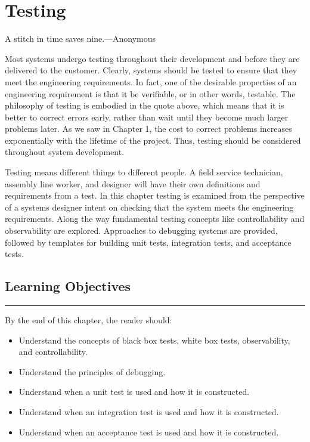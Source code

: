 \chapter{Testing}
\label{chapter:testing}
\graphicspath{ {./chapter07/Fig} }

\begin{itquote}
A stitch in time saves nine.---Anonymous
\end{itquote}


Most systems undergo testing throughout their development and before
they are delivered to the customer. Clearly, systems should be tested to
ensure that they meet the engineering requirements. In fact, one of the
desirable properties of an engineering requirement is that it be
verifiable, or in other words, testable. The philosophy of testing is
embodied in the quote above, which means that it is better to correct
errors early, rather than wait until they become much larger problems
later. As we saw in Chapter 1, the cost to correct problems increases
exponentially with the lifetime of the project. Thus, testing should be
considered throughout system development.

Testing means different things to different people. A field service
technician, assembly line worker, and designer will have their own
definitions and requirements from a test. In this chapter testing is
examined from the perspective of a systems designer intent on checking
that the system meets the engineering requirements. Along the way
fundamental testing concepts like controllability and observability are
explored. Approaches to debugging systems are provided, followed by
templates for building unit tests, integration tests, and acceptance
tests.

\section*{Learning Objectives}
\noindent\rule{\linewidth}{1pt}
By the end of this chapter, the reader should:

\begin{itemize}
\item
  Understand the concepts of black box tests, white box tests,
  observability, and controllability.
\item
  Understand the principles of debugging.
\item
  Understand when a unit test is used and how it is constructed.
\item
  Understand when an integration test is used and how it is constructed.
\item
  Understand when an acceptance test is used and how it is constructed.
\end{itemize}

